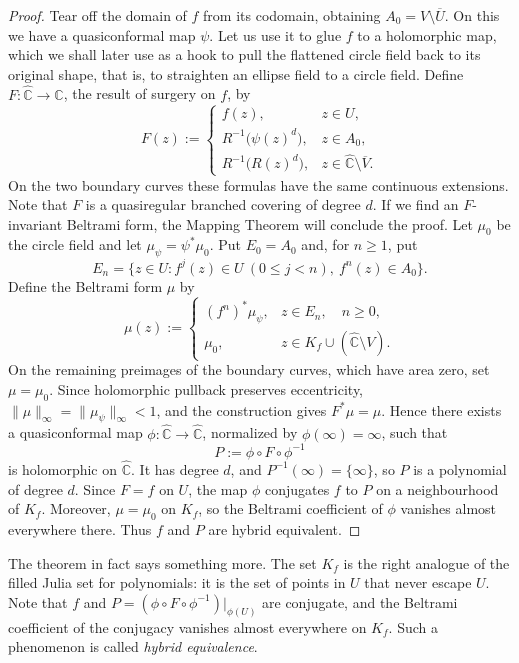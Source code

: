 \documentclass[11pt,a4paper]{article}
\begin{document}
\begin{proof}
Tear off the domain of $f$ from its codomain, obtaining
$A_0=V\setminus\overline U$. On this we have a quasiconformal map $\psi$.
Let us use it to glue $f$ to a holomorphic map, which we shall later use
as a hook to pull the flattened circle field back to its original shape,
that is, to straighten an ellipse field to a circle field.
Define $F\colon\widehat{\mathbb C}\to\widehat{\mathbb C}$, the result of surgery on $f$, by
\[
 F(z):=
 \begin{cases}
  f(z),&z\in U,\\
  R^{-1}\bigl(\psi(z)^d\bigr),&z\in A_0,\\
  R^{-1}\bigl(R(z)^d\bigr),&z\in\widehat{\mathbb C}\setminus\overline V.
 \end{cases}
\]
On the two boundary curves these formulas have the same continuous extensions. Note that $F$ is a quasiregular branched covering of degree $d$. If we find an $F$-invariant Beltrami form,
the Mapping Theorem will conclude the proof.
Let $\mu_0$ be the circle field and let $\mu_\psi=\psi^*\mu_0$. Put
$E_0=A_0$ and, for $n\geq1$, put
\[
 E_n=\{z\in U:f^j(z)\in U\ (0\leq j<n),\ f^n(z)\in A_0\}.
\]
Define the Beltrami form $\mu$ by
\[
\mu(z):=
\begin{cases}
  (f^n)^*\mu_\psi,&z\in E_n,\quad n\geq0,\\
  \mu_0,&z\in K_f\cup(\widehat{\mathbb C}\setminus V).
\end{cases}
\]
On the remaining preimages of the boundary curves, which have area zero, set $\mu=\mu_0$.
Since holomorphic pullback preserves eccentricity,
$\|\mu\|_\infty=\|\mu_\psi\|_\infty<1$, and the construction gives
$F^*\mu=\mu$. Hence there exists a quasiconformal map
$\phi\colon\widehat{\mathbb C}\to\widehat{\mathbb C}$, normalized by
$\phi(\infty)=\infty$, such that
\[
 P:=\phi\circ F\circ\phi^{-1}
\]
is holomorphic on $\widehat{\mathbb C}$. It has degree $d$, and
$P^{-1}(\infty)=\{\infty\}$, so $P$ is a polynomial of degree $d$.
Since $F=f$ on $U$, the map $\phi$ conjugates $f$ to $P$ on a
neighbourhood of $K_f$. Moreover, $\mu=\mu_0$ on $K_f$, so the
Beltrami coefficient of $\phi$ vanishes almost everywhere there.
Thus $f$ and $P$ are hybrid equivalent.
\end{proof}

The theorem in fact says something more. The set $K_f$ is the right analogue of the filled Julia set for polynomials:
it is the set of points in $U$ that never escape $U$.
Note that $f$ and
$P=(\phi\circ F\circ\phi^{-1})|_{\phi(U)}$ are conjugate, and the
Beltrami coefficient of the conjugacy vanishes almost everywhere on $K_f$.
Such a phenomenon is called \emph{hybrid equivalence}.


\end{document}
